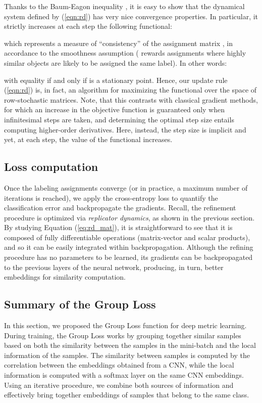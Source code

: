 \documentclass[runningheads]{llncs}
\begin{document}
Thanks to the Baum-Eagon inequality \cite{DBLP:journals/jmiv/Pelillo97}, it is easy to show that the dynamical system defined by (\ref{eqn:rd}) has very nice convergence properties. In particular, it strictly increases at each step the following functional:


which represents a measure of ``consistency'' of the assignment matrix , in accordance to the smoothness assumption ( rewards assignments where highly similar objects are likely to be assigned the same label).
In other words:

with equality if and only if  is a stationary point.
Hence, our update rule (\ref{eqn:rd}) is, in fact, an algorithm for maximizing the functional  over the space of row-stochastic matrices.
Note, that this contrasts with classical gradient methods, for which an increase in the objective function is guaranteed only when infinitesimal steps are taken, and determining the optimal step size entails computing higher-order derivatives. Here, instead, the step size is implicit and yet, at each step, the value of the functional increases. 

\label{refine}
\subsection{Loss computation}
Once the labeling assignments converge (or in practice, a maximum number of iterations is reached), we apply the cross-entropy loss to quantify the classification error and backpropagate the gradients. Recall, the refinement procedure is optimized via \textit{replicator dynamics}, as shown in the previous section. By studying Equation (\ref{eq:rd_mat}), it is straightforward to see that it is composed of fully differentiable operations (matrix-vector and scalar products), and so it can be easily integrated within backpropagation. 
Although the refining procedure has no parameters to be learned, its gradients can be backpropagated to the previous layers of the neural network, producing, in turn, better embeddings for similarity computation.



\subsection{Summary of the Group Loss} 
In this section, we proposed the Group Loss function for deep metric learning. 
During training, the Group Loss works by grouping together similar samples based on both the similarity between the samples in the mini-batch and the local information of the samples. The similarity between samples is computed by the correlation between the embeddings obtained from a CNN, while the local information is computed with a softmax layer on the same CNN embeddings. Using an iterative procedure, we combine both sources of information and effectively bring together embeddings of samples that belong to the same class.
\end{document}
